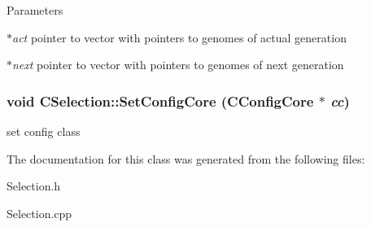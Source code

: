 \begin{DoxyParams}{Parameters}
\item[{\em $\ast$act}]pointer to vector with pointers to genomes of actual generation \item[{\em $\ast$next}]pointer to vector with pointers to genomes of next generation \end{DoxyParams}
\hypertarget{classCSelection_a87662aebda82944ed7eb8702ca85107e}{
\subsubsection[{SetConfigCore}]{\setlength{\rightskip}{0pt plus 5cm}void CSelection::SetConfigCore ({\bf CConfigCore} $\ast$ {\em cc})}}
\label{classCSelection_a87662aebda82944ed7eb8702ca85107e}
set config class 

The documentation for this class was generated from the following files:\begin{DoxyCompactItemize}
\item 
Selection.h\item 
Selection.cpp\end{DoxyCompactItemize}
